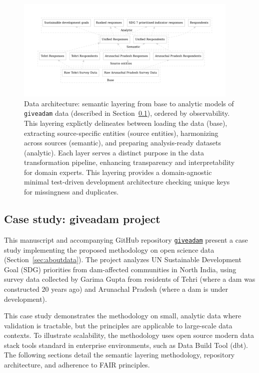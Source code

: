 \documentclass{article}
\begin{document}
\begin{figure}[ht]
  \centering
  \includegraphics[width=0.95\textwidth]{figures/architecture.pdf}
  \caption{Data architecture: semantic layering from base to analytic models of \texttt{giveadam} data (described in Section~\ref{sec:case-study}), ordered by observability. This layering explictly delineates between loading the data (base), extracting source-specific entities (source entities), harmonizing across sources (semantic), and preparing analysis-ready datasets (analytic). Each layer serves a distinct purpose in the data transformation pipeline, enhancing transparency and interpretability for domain experts. This layering provides a domain-agnostic minimal test-driven development architecture checking unique keys for missingness and duplicates.}
  \label{fig:architecture}
\end{figure}

\subsection{Case study: giveadam project}
\label{sec:case-study}

This manuscript and accompanying GitHub repository \href{https://github.com/softloud/giveadam}{\texttt{giveadam}} present a case study implementing the proposed methodology on open science data (Section~\ref{sec:aboutdata}). The project analyzes UN Sustainable Development Goal (SDG) priorities from dam-affected communities in North India, using survey data collected by Garima Gupta from residents of Tehri (where a dam was constructed 20 years ago) and Arunachal Pradesh (where a dam is under development).

This case study demonstrates the methodology on small, analytic data where validation is tractable, but the principles are applicable to large-scale data contexts. To illustrate scalability, the methodology uses open source modern data stack tools standard in enterprise environments, such as Data Build Tool (dbt). The following sections detail the semantic layering methodology, repository architecture, and adherence to FAIR principles.
\end{document}
